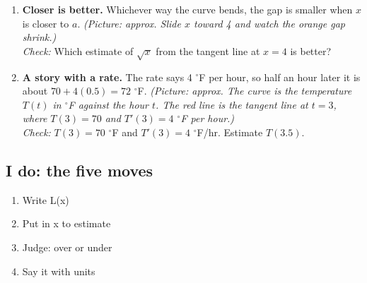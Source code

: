 \documentclass[11pt]{article}
\begin{document}
\begin{enumerate}
\item \textbf{Closer is better.} Whichever way the curve bends, the gap is smaller when $x$ is closer to $a$. \textit{(Picture: approx. Slide $x$ toward 4 and watch the orange gap shrink.)}\\ \textit{Check:} Which estimate of $\sqrt{x}$ from the tangent line at $x=4$ is better? 
\item \textbf{A story with a rate.} The rate says 4 $^\circ$F per hour, so half an hour later it is about $70+4(0.5)=72$ $^\circ$F. \textit{(Picture: approx. The curve is the temperature $T(t)$ in $^\circ$F against the hour $t$. The red line is the tangent line at $t=3$, where $T(3)=70$ and $T'(3)=4$ $^\circ$F per hour.)}\\ \textit{Check:} $T(3)=70$ $^\circ$F and $T'(3)=4$ $^\circ$F/hr. Estimate $T(3.5)$. 
\end{enumerate}
\subsection*{I do: the five moves}\begin{enumerate}\item Write L(x)
\item Put in x to estimate
\item Judge: over or under
\item Say it with units\end{enumerate}
\end{document}
